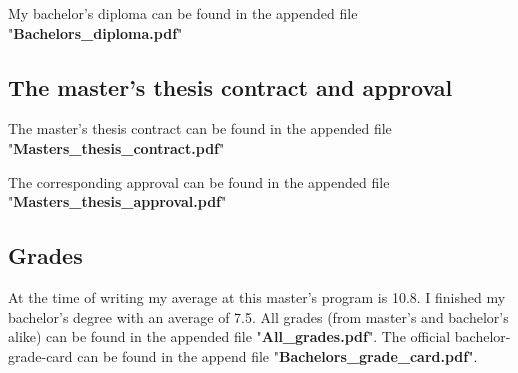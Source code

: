 \documentclass[a4paper]{article}
\begin{document}
My bachelor's diploma can be found in the appended file "\textbf{Bachelors\_diploma.pdf}"

\subsection{The master's thesis contract and approval}

The master's thesis contract can be found in the appended file "\textbf{Masters\_thesis\_contract.pdf}"\par

The corresponding approval can be found in the appended file "\textbf{Masters\_thesis\_approval.pdf}"

\subsection{Grades}

At the time of writing my average at this master's program is 10.8. I finished my bachelor's degree with an average of 7.5. All grades (from master's and bachelor's alike) can be found in the appended file "\textbf{All\_grades.pdf}". The official bachelor-grade-card can be found in the append file "\textbf{Bachelors\_grade\_card.pdf}".\par
\end{document}
